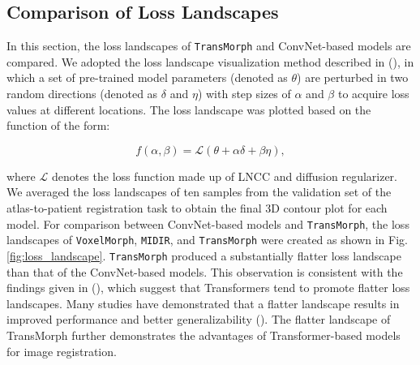 \documentclass[times,twocolumn,final]{elsarticle}
\begin{document}
\subsection{Comparison of Loss Landscapes}
In this section, the loss landscapes of \texttt{TransMorph} and ConvNet-based models are compared. We adopted the loss landscape visualization method described in (\cite{li2018visualizing, goodfellow2014qualitatively, im2016empirical}), in which a set of pre-trained model parameters (denoted as $\theta$) are perturbed in two random directions (denoted as $\delta$ and $\eta$) with step sizes of $\alpha$ and $\beta$ to acquire loss values at different locations. The loss landscape was plotted based on the function of the form:
\begin{linenomath}
\begin{equation}
    f(\alpha, \beta) = \mathcal{L}(\theta+\alpha\delta+\beta\eta),
\end{equation}
\end{linenomath}
where $\mathcal{L}$ denotes the loss function made up of LNCC and diffusion regularizer. We averaged the loss landscapes of ten samples from the validation set of the atlas-to-patient registration task to obtain the final 3D contour plot for each model. For comparison between ConvNet-based models and \texttt{TransMorph}, the loss landscapes of \texttt{VoxelMorph}, \texttt{MIDIR}, and \texttt{TransMorph} were created as shown in Fig. \ref{fig:loss_landscape}. \texttt{TransMorph} produced a substantially flatter loss landscape than that of the ConvNet-based models. This observation is consistent with the findings given in (\cite{park2022vision}), which suggest that Transformers tend to promote flatter loss landscapes. Many studies have demonstrated that a flatter landscape results in improved performance and better generalizability (\cite{park2022vision, keskar2016large, santurkar2018does, foret2020sharpness, li2018visualizing}). The flatter landscape of TransMorph further demonstrates the advantages of Transformer-based models for image registration.
\end{document}
